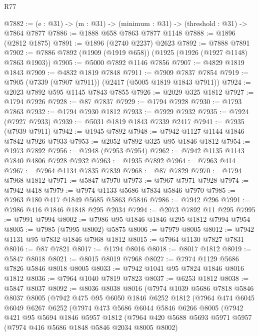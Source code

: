 \begin{lexlean}{R77}
\begin{coremodule}
@7882 := (e : @31) -> (m : @31) -> (minimum : @31) -> (threshold : @31) -> @7864 @7877
@7886 := @1888 @658 @7863 @7877 @1148
@7888 := @1896 (@2812 @1875)
@7891 := @1896 (@2740 @2237) @2623
@7892 := @7888 @7891
@7902 := @7886 @7892 (@1909 (@1919 @658)) (@1925 (@1926 (@1927 @1148) @7863 @1903))
@7905 := @5000 @7892 @1146 @7856
@7907 := @4829 @1819 @1843
@7909 := @4832 @1819 @7848
@7911 := @7909 @7837 @7854
@7919 := @7905 (@7339 (@7907 @7911)) (@2417 (@5005 @1819 @1843 @7911))
@7924 := @2023 @7892 @595 @1145 @7843 @7855
@7926 := @2029 @325 @1812
@7927 := @1794 @7926
@7928 := @87 @7837
@7929 := @1794 @7928
@7930 := @1793 @7863
@7932 := @1794 @7930 @1812
@7933 := @7929 @7932
@7935 := @7924 (@7927 @7933)
@7939 := @5031 @1819 @1843 @7339 @2417
@7941 := @7935 (@7939 @7911)
@7942 := @1945 @7892
@7948 := @7942 @1127 @1144 @1846 @7842 @7926 @7933
@7953 := @2052 @7892 @325 @95 @1846 @1812
@7954 := @1973 @7892
@7956 := @7948 (@7953 @7954)
@7962 := @7942 @1135 @1143 @7840 @4806 @7928 @7932
@7963 := @1935 @7892
@7964 := @7963 @414
@7967 := @7964 @1134 @7835 @7839
@7968 := @87 @7829
@7970 := @1794 @7968 @1812
@7971 := @5847 @7970
@7973 := @7967 @7971 @7928
@7974 := @7942 @418
@7979 := @7974 @1133 @5686 @7834 @5846 @7970
@7985 := @7963 @180 @417 @1849 @5685 @5863 @5846
@7986 := @7942 @296
@7991 := @7986 @416 @1846 @1848 @295 @2034
@7994 := @2073 @7892 @11 @295
@7995 := @7991 @7994
@8002 := @7986 @95 @1846 @1846 @295 @1812 @7994 @7954
@8005 := @7985 (@7995 @8002) @5875
@8006 := @7979 @8005
@8012 := @7942 @1131 @95 @7832 @1846 @7968 @1812
@8015 := @7964 @1130 @7827 @7831
@8016 := @87 @7821
@8017 := @1794 @8016
@8018 := @8017 @1812
@8019 := @5847 @8018
@8021 := @8015 @8019 @7968
@8027 := @7974 @1129 @5686 @7826 @5846 @8018 @8005
@8033 := @7942 @1041 @95 @7824 @1846 @8016 @1812
@8036 := @7964 @1040 @7819 @7823
@8037 := @6253 @1812
@8038 := @5847 @8037
@8092 := @8036
    @8038
    @8016
    (@7974
      @1039
      @5686
      @7818
      @5846
      @8037
      @8005
      (@7942
        @475
        @95
        @6050
        @1846
        @6252
        @1812
        (@7964
          @474
          @6045
          @6049
          @6267
          @6252
          (@7974
            @473
            @5686
            @6044
            @5846
            @6266
            @8005
            (@7942
              @421
              @95
              @5694
              @1846
              @5957
              @1812
              (@7964
                @420
                @5688
                @5693
                @5971
                @5957
                (@7974 @416 @5686 @1848 @5846 @2034 @8005 @8002)

\end{coremodule}
\end{lexlean}
